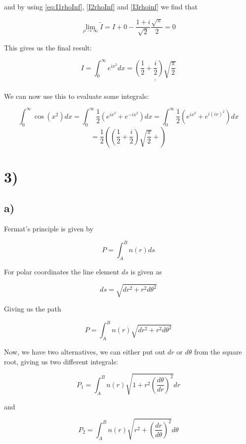 \documentclass[a4paper,norsk, 10pt]{article}
\begin{document}
and by using \ref{eq:I1rhoInf}, \ref{I2rhoInf} and \ref{I3rhoinf} we find that

$$
\lim_{\rho \rightarrow \infty} \tilde{I} = I + 0 - \frac{1+i}{\sqrt{2}} \frac{\sqrt{\pi}}{2} = 0
$$

This gives us the final result:

$$
I = \int_0^{\infty}e^{ix^2}dx =\underline{\underline{\left(\frac{1}{2} +\frac{i}{2}\right) \sqrt{\frac{\pi}{2}}}}
$$\\

We can now use this to evaluate some integrals:

$$
\int_0^{\infty} \cos(x^2) dx = \int_0^{\infty} \frac{1}{2}(e^{ix^2} + e^{-ix^2}) dx  = \int_0^{\infty} \frac{1}{2}(e^{ix^2} + e^{i(ix)^2}) dx
$$
$$
= \frac{1}{2}\left(\left(\frac{1}{2} +\frac{i}{2}\right) \sqrt{\frac{\pi}{2}}  + \right)
$$



\section*{3)}
\subsection*{a)}

Fermat's principle is given by

\begin{equation}
P = \int_A^B n(r) ds
\end{equation}

For polar coordinates the line element $ds$ is given as 

$$
ds = \sqrt{dr^2 + r^2d\theta^2}
$$

Giving us the path

$$
P = \int_A^B n(r) \sqrt{dr^2 + r^2d\theta^2}
$$

Now, we have two alternatives, we can either put out $dr$ or $d\theta$ from the square root, giving us two different integrals:

\begin{equation}
P_1 = \int_A^B n(r)\sqrt{1 + r^2 \left(\frac{d\theta}{dr}\right)^2} dr
\label{eq:p1}
\end{equation}



and

\begin{equation}
P_2 = \int_A^B n(r)\sqrt{r^2 +  \left(\frac{dr}{d\theta}\right)^2} d\theta
\label{eq:p2}
\end{equation}
\end{document}
